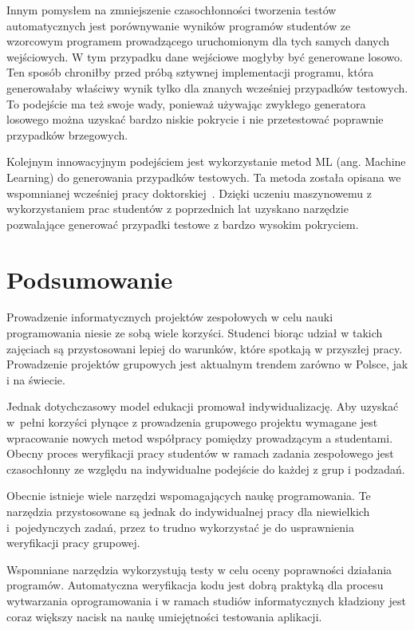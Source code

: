 Innym pomysłem na zmniejszenie czasochłonności tworzenia testów automatycznych jest porównywanie wyników programów studentów ze wzorcowym programem prowadzącego uruchomionym dla tych samych danych wejściowych.
W tym przypadku dane wejściowe mogłyby być generowane losowo.
Ten sposób chroniłby przed próbą sztywnej implementacji programu, która generowałaby właściwy wynik tylko dla znanych wcześniej przypadków testowych.
To podejście ma też swoje wady, ponieważ używając zwykłego generatora losowego można uzyskać bardzo niskie pokrycie i nie przetestować poprawnie przypadków brzegowych.

Kolejnym innowacyjnym podejściem jest wykorzystanie metod ML (ang. Machine Learning) do generowania przypadków testowych.
Ta metoda została opisana we wspomnianej wcześniej pracy doktorskiej~\cite{teach-testing-thesis}.
Dzięki uczeniu maszynowemu z wykorzystaniem prac studentów z poprzednich lat uzyskano narzędzie pozwalające generować przypadki testowe z bardzo wysokim pokryciem.



\section{Podsumowanie}

Prowadzenie informatycznych projektów zespołowych w celu nauki programowania niesie ze sobą wiele korzyści.
Studenci biorąc udział w takich zajęciach są przystosowani lepiej do warunków, które spotkają w przyszłej pracy.
Prowadzenie projektów grupowych jest aktualnym trendem zarówno w Polsce, jak i na świecie.

Jednak dotychczasowy model edukacji promował indywidualizację.
Aby uzyskać w~pełni korzyści płynące z prowadzenia grupowego projektu wymagane jest wpracowanie nowych metod współpracy pomiędzy prowadzącym a studentami.
Obecny proces weryfikacji pracy studentów w ramach zadania zespołowego jest czasochłonny ze względu na indywidualne podejście do każdej z grup i podzadań.

Obecnie istnieje wiele narzędzi wspomagających naukę programowania.
Te narzędzia przystosowane są jednak do indywidualnej pracy dla niewielkich i~pojedynczych zadań, przez to trudno wykorzystać je do usprawnienia weryfikacji pracy grupowej.

Wspomniane narzędzia wykorzystują testy w celu oceny poprawności działania programów.
Automatyczna weryfikacja kodu jest dobrą praktyką dla procesu wytwarzania oprogramowania i w ramach studiów informatycznych kładziony jest coraz większy nacisk na naukę umiejętności testowania aplikacji.

